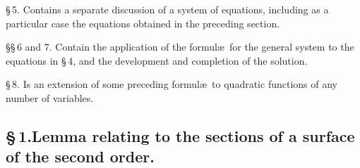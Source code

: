 \documentclass[11pt]{article}
\begin{document}
\noindent\S\,5. Contains a separate discussion of a system of equations, including as a particular case the equations obtained in the preceding section.

\noindent\S\S\,6 and 7. Contain the application of the formul\ae\ for the general system to the equations in \S\,4, and the development and completion of the solution.

\noindent\S\,8. Is an extension of some preceding formul\ae\ to quadratic functions of any number of variables.

\bigskip

\subsection*{\S\,1.\quad Lemma relating to the sections of a surface of the second order.}
\end{document}
